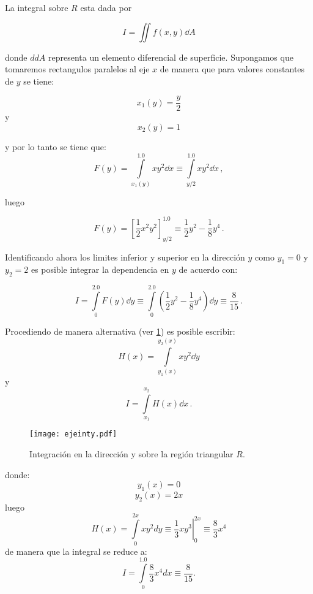 La integral sobre $R$ esta dada por

\[I = \iint f(x,y) \dd{A}\]

donde $dd{A}$ representa un elemento diferencial de superficie. Supongamos que tomaremos rectangulos paralelos al eje $x$ de manera que para valores constantes de $y$ se tiene:

\[x_1(y) = \frac{y}{2}\]
y
\[x_2(y) = 1\]

y por lo tanto se tiene que:
\[F(y) = \int\limits_{x_1(y)}^{1.0} x y^2 \dd{x}  \equiv \int\limits_{y/2}^{1.0} x y^2 \dd{x}\, , \]

luego

\[F(y) = \left[ \frac{1}{2} x^2 y^2 \right]_{y/2}^{1.0} \equiv \frac{1}{2} y^2 
- \frac{1}{8}  y^4\, .\]

Identificando ahora los limites inferior y superior en la dirección $y$ como ${y_1} = 0$ y ${y_2} = 2$ es posible integrar la dependencia en $y$ de acuerdo con:

\[I = \int\limits_0^{2.0} F(y) \dd{y}  \equiv \int\limits_0^{2.0} 
\left(\frac{1}{2}y^2 - \frac{1}{8} y^4\right) \dd{y}  \equiv \frac{8}{15}\, .\]



Procediendo de manera alternativa (ver \cref{fig:ejeinty}) es posible escribir:
\[H(x) = \int\limits_{y_1(x)}^{y_2(x)} x y^2 \dd{y} \]
y
\[I = \int\limits_{x_1}^{x_2} H(x) \dd{x}\, . \]

\begin{figure}[H]
\centering
\texttt{[image: ejeinty.pdf]}
\caption{Integración en la dirección y sobre la región triangular $R$.}
\label{fig:ejeinty}
\end{figure}

donde:
\[{y_1}(x) = 0\]
\[{y_2}(x) = 2x\]
luego
\[H(x) = \int\limits_0^{2x} {x{y^2}dy}  \equiv \left. {\frac{1}{3}x{y^3}} \right|_0^{2x} \equiv \frac{8}{3}{x^4}\]
de manera que la integral se reduce a:
\[I = \int\limits_0^{1.0} {\frac{8}{3}{x^4}dx}  \equiv \frac{8}{{15}}.\]

